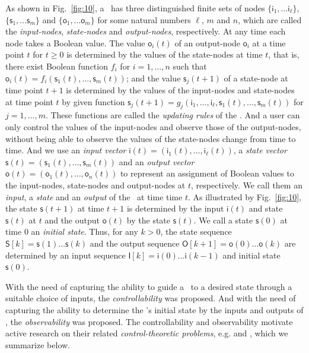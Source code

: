 As shown in Fig.~\ref{fig:10}, a \BCN\ has three distinguished finite sets of nodes $\{\mathsf{i}_1,\ldots\mathsf{i}_\ell\}$, $\{\mathsf{s}_1,\ldots\mathsf{s}_m\}$ and $\{\mathsf{o}_1,\ldots\mathsf{o}_m\}$ for some natural numbers $\ell$, $m$ and $n$, which are called the {\em input-nodes}, {\em state-nodes}  and {\em output-nodes}, respectively. At any time each node takes a Boolean value. The value $\mathsf{o}_i(t)$ of an output-node $\mathsf{o}_i$ at a time point $t$ for $t\ge0$ is determined by the values of the state-nodes at time $t$, that is, there exist Boolean function $f_i$ for $i=1,\ldots,n$ such that $\mathsf{o}_i(t)=f_i(\mathsf{s}_1(t),\ldots,\mathsf{s}_m(t))$; and the value $\mathsf{s}_j(t+1)$ of a state-node at time point $t+1$ is determined by the values of the input-nodes and state-nodes at time point $t$ by given function $\mathsf{s}_j(t+1)=g_j(\mathsf{i}_1,\ldots,\mathsf{i}_\ell,\mathsf{s}_1(t),\ldots,\mathsf{s}_m(t))$ for $j=1,\ldots,m$. These functions are called the {\em updating rules} of the \BCN. And a user can only control the  values of the input-nodes and observe those of the output-nodes, without being able to observe the values of the state-nodes change from time to time. And we use an {\em input vector} $\mathsf{i}(t)=(\mathsf{i}_1(t),\ldots,\mathsf{i}_\ell (t))$, a {\em state vector} $\mathsf{s}(t)=(\mathsf{s}_1(t), \ldots, \mathsf{s}_m(t))$ and an {\em output  vector} $\mathsf{o}(t)=(\mathsf{o}_1(t),\ldots, \mathsf{o}_n(t))$  to represent an assignment of Boolean values to the  input-nodes, state-nodes and  output-nodes at $t$, respectively.  We call them an {\em input}, a {\em state} and an {\em output} of the \BCN\ at time time $t$. As  illustrated by Fig.~\ref{fig:10},  the state $\mathsf{s}(t+1)$ at time $t+1$ is determined by the input   $\mathsf{i}(t)$ and state $\mathsf{s}(t)$ at $t$  and the output   $\mathsf{o}(t)$ by the state  $\mathsf{s}(t)$.  We call a state $\mathsf{s}(0)$ at time $0$ an {\em initial state}. Thus, for any $k>0$, the state sequence  $\mathsf{S}[k]=\mathsf{s}(1)\ldots\mathsf{s}(k)$ and the output sequence $\mathsf{O}[k+1]=\mathsf{o}(0)\ldots\mathsf{o}(k)$ are  determined by an  input sequence $\mathsf{I}[k]=\mathsf{i}(0)\ldots\mathsf{i}(k-1)$ and initial state $\mathsf{s}(0)$. 

With the need of capturing the ability to guide a \BCN\ to a desired state through a suitable choice of inputs, the {\em controllability} was proposed. And with the need of capturing the ability to determine the \BCN's initial state by the inputs and outputs of \BCN, the {\em observability}  was proposed. The controllability and observability motivate active research on their related {\em control-theoretic problems}, e.g.  \cite{cheng2009controllability, Zhao2010Input, Cheng2011Identification, Cheng2011Analysis} and \cite{Fornasini2013Observability}, which we summarize below.


